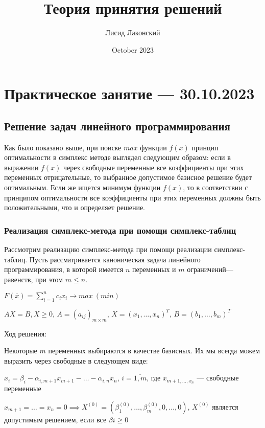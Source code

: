 \documentclass{article}
\title{Теория принятия решений}
\author{Лисид Лаконский}
\date{October 2023}
\begin{document}
\raggedright

\maketitle

\tableofcontents
\pagebreak

\section{Практическое занятие — 30.10.2023}

\subsection{Решение задач линейного программирования}

Как было показано выше, при поиске $max$ функции $f(x)$ принцип оптимальности в симплекс методе выглядел следующим образом: если в выражении $f(x)$ через свободные переменные все коэффициенты при этих переменных отрицательные, то выбранное допустимое базисное решение будет оптимальным. Если же ищется минимум функции $f(x)$, то в соответствии с принципом оптимальности все коэффициенты при этих переменных должны быть положительными, что и определяет решение.

\subsubsection{Реализация симплекс-метода при помощи симплекс-таблиц}

Рассмотрим реализацию симплекс-метода при помощи реализации симплекс-таблиц. Пусть рассматривается каноническая задача линейного программирования, в которой имеется $n$ переменных и $m$ ограничений—равенств, при этом $m \le n$.

$F(\overline{x}) = \sum\limits_{i = 1}^{n} c_i x_i \to max \ (min)$

$AX = B, X \ge 0$, $A = (a_{i j})_{m \times m}$, $X = (x_1, \dots, x_{n})^{T}$, $B = (b_1, \dots, b_{m})^{T}$

Ход решения:

Некоторые $m$ переменных выбираются в качестве базисных. Их мы всегда можем выразить через свободные в следующем виде:
    
$x_{i} = \beta_{i} - \alpha_{i, m + 1} x_{m + 1} - \dots - \alpha_{i, n} x_{n}$, $i = \overline{1, m}$, где $x_{m + 1, \dots, x_{n}}$ — свободные переменные

$x_{m + 1} = \dots = x_{n} = 0 \implies X^{(0)} = (\beta_1^{(0)}, \dots, \beta_{m}^{(0)}, 0, \dots, 0)$, $X^{(0)}$ является допустимым решением, если все $\beta{i} \ge 0$
\end{document}

